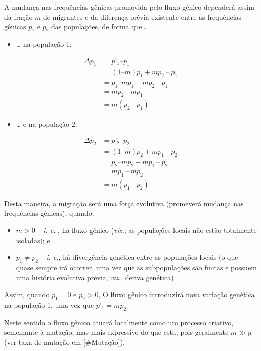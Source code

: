 \documentclass[
]{book}
\providecommand{\tightlist}{%
  \setlength{\itemsep}{0pt}\setlength{\parskip}{0pt}}
\begin{document}
A mudança nas frequências gênicas promovida pelo fluxo gênico dependerá assim da fração \(m\) de migrantes e da diferença prévia existente entre as frequências gênicas \(p_1\) e \(p_2\) das populações, de forma que\ldots{}

\begin{itemize}
\tightlist
\item
  \ldots{} na população 1:
\end{itemize}

\[
\begin{aligned}
\Delta p_1
&= p’_1 –  p_1 \\
&= (1 – m)p_1 + mp_2 \ – \ p_1 \\
&= p_1 – mp_1 + mp_2 \ – \ p_1 \\
&= mp_2 \ – \  mp_1 \\
&= m(p_2 \ – \ p_1)
\end{aligned}
\]

\begin{itemize}
\tightlist
\item
  \ldots{} e na população 2:
\end{itemize}

\[
\begin{aligned}
\Delta p_2
&= p’_2 –  p_2 \\
&= (1 – m)p_2 + mp_1 \ – \ p_2 \\
&= p_2 – mp_2 + mp_1 \ – \ p_2 \\
&= mp_1 \ – \  mp_2 \\
&= m(p_1 \ – \ p_2)
\end{aligned}
\]

Desta maneira, a migração será uma força evolutiva (promeverá mudança nas frequências gênicas), quando:

\begin{itemize}
\item
  \(m > 0\) -- \emph{i. e.} , há fluxo gênico (\emph{viz.}, as populações locais não estão totalmente isoladas); e
\item
  \(p_1 \neq p_2\) -- \emph{i. e.}, há divergência genética entre as populações locais (o que quase sempre irá ocorrer, uma vez que as subpopulações são finitas e possuem uma história evolutiva prévia, \emph{viz.}, deriva genética).
\end{itemize}

Assim, quando \(p_1 = 0\) e \(p_2 > 0\), O fluxo gênico introduzirá nova variação genética na população 1, uma vez que \(p’_1 = mp_2\)

Neste sentido o fluxo gênico atuará localmente como um processo criativo, semelhante à mutação, mas mais expressivo do que esta, pois geralmente \(m \gg µ\) (ver taxa de mutação em {[}\#Mutação{]}).
\end{document}
